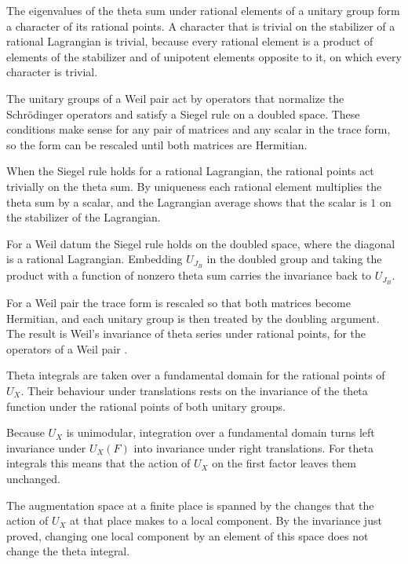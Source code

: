 The eigenvalues of the theta sum under rational elements of a unitary group form
a character of its rational points. A character that is trivial on the
stabilizer of a rational Lagrangian is trivial, because every rational element
is a product of elements of the stabilizer and of unipotent elements opposite to
it, on which every character is trivial.

The unitary groups of a Weil pair act by operators that normalize the
Schrödinger operators and satisfy a Siegel rule on a doubled space. These
conditions make sense for any pair of matrices and any scalar in the trace form,
so the form can be rescaled until both matrices are Hermitian.

When the Siegel rule holds for a rational Lagrangian, the rational points act
trivially on the theta sum. By uniqueness each rational element multiplies the
theta sum by a scalar, and the Lagrangian average shows that the scalar is $1$
on the stabilizer of the Lagrangian.

For a Weil datum the Siegel rule holds on the doubled space, where the diagonal
is a rational Lagrangian. Embedding $U_{J_B}$ in the doubled group and taking
the product with a function of nonzero theta sum carries the invariance back to
$U_{J_B}$.

For a Weil pair the trace form is rescaled so that both matrices become
Hermitian, and each unitary group is then treated by the doubling argument. The
result is Weil's invariance of theta series under rational points, for the
operators of a Weil pair \cite{Wei64}.

Theta integrals are taken over a fundamental domain for the rational points of
$U_X$. Their behaviour under translations rests on the invariance of the theta
function under the rational points of both unitary groups.

Because $U_X$ is unimodular, integration over a fundamental domain turns left
invariance under $U_X(F)$ into invariance under right translations. For theta
integrals this means that the action of $U_X$ on the first factor leaves them
unchanged.

The augmentation space at a finite place is spanned by the changes that the
action of $U_X$ at that place makes to a local component. By the invariance
just proved, changing one local component by an element of this space does not
change the theta integral.

